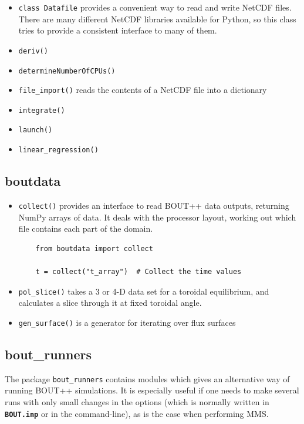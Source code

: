 \documentclass[12pt]{article}
\newcommand{\file}[1]{\texttt{\bf #1}}
\begin{document}
\begin{itemize}
\item \lstinline!class Datafile! provides a convenient way to read and write NetCDF files. There are many different
  NetCDF libraries available for Python, so this class tries to provide a consistent interface to many of them.
\item \lstinline!deriv()!
\item \lstinline!determineNumberOfCPUs()!
\item \lstinline!file_import()! reads the contents of a NetCDF file into a dictionary
\item \lstinline!integrate()!
\item \lstinline!launch()!
\item \lstinline!linear_regression()!
\end{itemize}

\subsection{boutdata}

\begin{itemize}
\item \lstinline!collect()! provides an interface to read BOUT++ data outputs, returning NumPy arrays of data.
  It deals with the processor layout, working out which file contains each part of the domain.
  \begin{lstlisting}
    from boutdata import collect

    t = collect("t_array")  # Collect the time values
  \end{lstlisting}
\item \lstinline!pol_slice()! takes a 3 or 4-D data set for a toroidal equilibrium, and calculates a slice
  through it at fixed toroidal angle.
\item \lstinline!gen_surface()! is a generator for iterating over flux surfaces
\end{itemize}

\subsection{bout\_runners}\label{sec:bout_runners}
The package \lstinline!bout_runners! contains modules which gives an
alternative way of running BOUT++ simulations. It is especially useful if one
needs to make several runs with only small changes in the options (which is
normally written in \file{BOUT.inp} or in the command-line), as is the
case when performing MMS.
\end{document}
